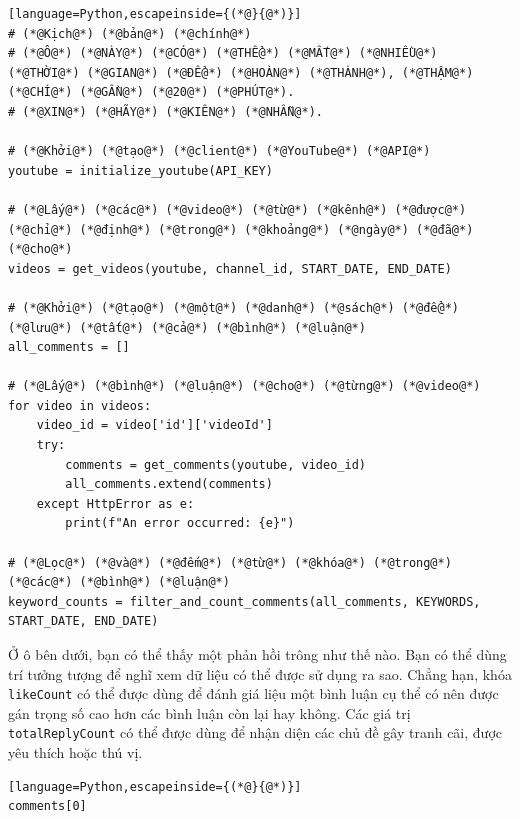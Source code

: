 \begin{lstlisting}[language=Python,escapeinside={(*@}{@*)}]
# (*@Kịch@*) (*@bản@*) (*@chính@*)
# (*@Ô@*) (*@NÀY@*) (*@CÓ@*) (*@THỂ@*) (*@MẤT@*) (*@NHIỀU@*) (*@THỜI@*) (*@GIAN@*) (*@ĐỂ@*) (*@HOÀN@*) (*@THÀNH@*), (*@THẬM@*) (*@CHÍ@*) (*@GẦN@*) (*@20@*) (*@PHÚT@*).
# (*@XIN@*) (*@HÃY@*) (*@KIÊN@*) (*@NHẪN@*).

# (*@Khởi@*) (*@tạo@*) (*@client@*) (*@YouTube@*) (*@API@*)
youtube = initialize_youtube(API_KEY)

# (*@Lấy@*) (*@các@*) (*@video@*) (*@từ@*) (*@kênh@*) (*@được@*) (*@chỉ@*) (*@định@*) (*@trong@*) (*@khoảng@*) (*@ngày@*) (*@đã@*) (*@cho@*)
videos = get_videos(youtube, channel_id, START_DATE, END_DATE)

# (*@Khởi@*) (*@tạo@*) (*@một@*) (*@danh@*) (*@sách@*) (*@để@*) (*@lưu@*) (*@tất@*) (*@cả@*) (*@bình@*) (*@luận@*)
all_comments = []

# (*@Lấy@*) (*@bình@*) (*@luận@*) (*@cho@*) (*@từng@*) (*@video@*)
for video in videos:
    video_id = video['id']['videoId']
    try:
        comments = get_comments(youtube, video_id)
        all_comments.extend(comments)
    except HttpError as e:
        print(f"An error occurred: {e}")

# (*@Lọc@*) (*@và@*) (*@đếm@*) (*@từ@*) (*@khóa@*) (*@trong@*) (*@các@*) (*@bình@*) (*@luận@*)
keyword_counts = filter_and_count_comments(all_comments, KEYWORDS, START_DATE, END_DATE)
\end{lstlisting}

Ở ô bên dưới, bạn có thể thấy một phản hồi trông như thế nào. Bạn có thể dùng trí tưởng tượng để nghĩ xem dữ liệu có thể được sử dụng ra sao. Chẳng hạn, khóa \texttt{likeCount} có thể được dùng để đánh giá liệu một bình luận cụ thể có nên được gán trọng số cao hơn các bình luận còn lại hay không. Các giá trị \texttt{totalReplyCount} có thể được dùng để nhận diện các chủ đề gây tranh cãi, được yêu thích hoặc thú vị.

\begin{lstlisting}[language=Python,escapeinside={(*@}{@*)}]
comments[0]
\end{lstlisting}

